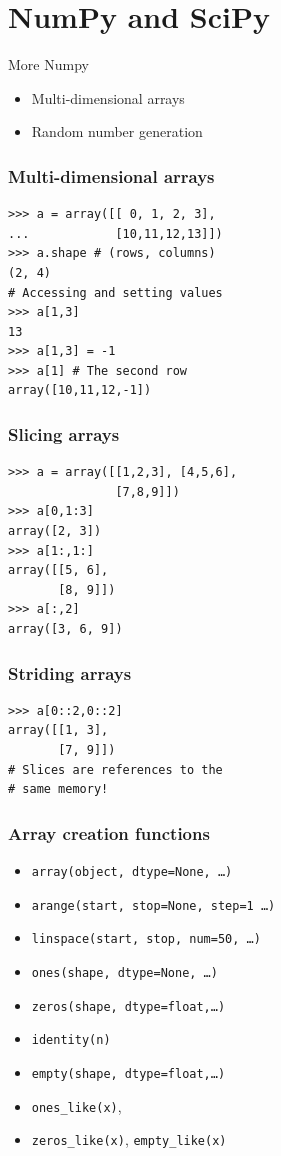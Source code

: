 \documentclass[14pt,compress]{beamer}
\newcommand{\typ}[1]{\texttt{#1}}
\begin{document}
\section{NumPy and SciPy}

\begin{frame}
    {More Numpy}

    \begin{itemize}
        \item Multi-dimensional arrays
        \item Random number generation
    \end{itemize}

\end{frame}

\begin{frame}[fragile]
  \frametitle{Multi-dimensional arrays}
\begin{lstlisting}
>>> a = array([[ 0, 1, 2, 3],
...            [10,11,12,13]])
>>> a.shape # (rows, columns)
(2, 4)
# Accessing and setting values
>>> a[1,3] 
13
>>> a[1,3] = -1
>>> a[1] # The second row
array([10,11,12,-1])

\end{lstlisting}
\end{frame}

\begin{frame}[fragile]
  \frametitle{Slicing arrays}
\begin{lstlisting}
>>> a = array([[1,2,3], [4,5,6], 
               [7,8,9]])
>>> a[0,1:3]
array([2, 3])
>>> a[1:,1:]
array([[5, 6],
       [8, 9]])
>>> a[:,2]
array([3, 6, 9])
\end{lstlisting}
\end{frame}
\begin{frame}[fragile]
  \frametitle{Striding arrays}
\begin{lstlisting}
>>> a[0::2,0::2]
array([[1, 3],
       [7, 9]])
# Slices are references to the 
# same memory!
\end{lstlisting}
\end{frame}

\begin{frame}[fragile]
  \frametitle{Array creation functions}
  \begin{itemize}
  \item \typ{array(object, dtype=None, \ldots)}
  \item \typ{arange(start, stop=None, step=1 \ldots)}
  \item \typ{linspace(start, stop, num=50, \ldots)}
  \item \typ{ones(shape, dtype=None, \ldots)}
  \item \typ{zeros(shape, dtype=float,\ldots)}
  \item \typ{identity(n)}
  \item \typ{empty(shape, dtype=float,\ldots)}
  \item \typ{ones\_like(x)}, 
  \item \typ{zeros\_like(x)}, \typ{empty\_like(x)}
  \end{itemize}
\end{frame}
\end{document}
